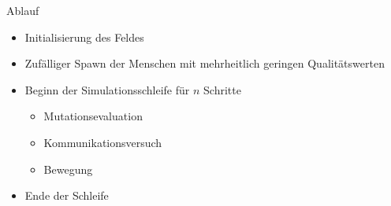 \begin{frame} {Ablauf}
	\begin{itemize}
		\item Initialisierung des Feldes
		\item Zufälliger Spawn der Menschen mit mehrheitlich geringen Qualitätswerten
		\item Beginn der Simulationsschleife für \(n\) Schritte
		\begin{itemize}
			\item Mutationsevaluation
			\item Kommunikationsversuch
			\item Bewegung
		\end{itemize}
		\item Ende der Schleife
	\end{itemize}
\end{frame}
